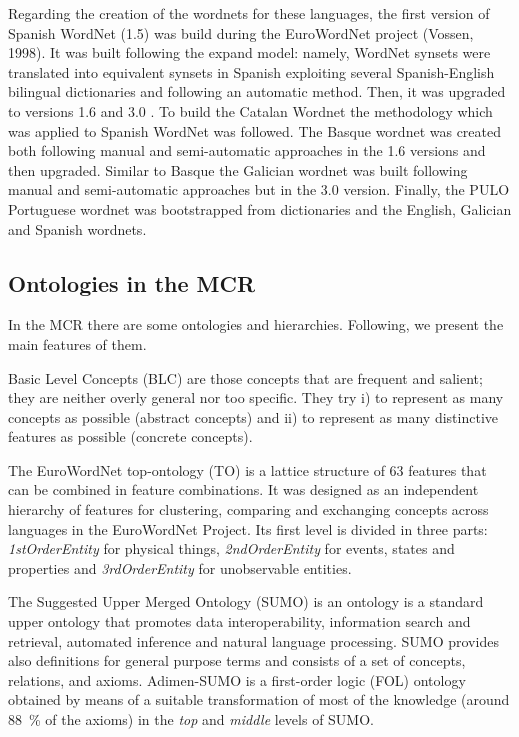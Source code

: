 \documentclass[runningheads]{llncs}
\begin{document}
Regarding the creation of the wordnets for these languages, the  first  version  of  Spanish  WordNet (1.5) \cite{atserias97,Farreres1998using} was build during the EuroWordNet project (Vossen, 1998). It was built following the  expand model: namely, WordNet synsets were translated into equivalent synsets in Spanish exploiting several Spanish-English bilingual dictionaries and following an automatic method. Then, it was upgraded to versions 1.6 \cite{atserias04}  and 3.0 \cite{gonzalez2012multilingual}.  To build the Catalan Wordnet \cite{benitez1998methods} the  methodology which was  applied  to  Spanish  WordNet was followed. The Basque wordnet was created both following manual and semi-automatic approaches \cite{pociello2011methodology} in the 1.6 versions and then upgraded.  Similar to Basque the Galician wordnet \cite{galnet}  was built following  manual and semi-automatic approaches but in the 3.0 version. Finally, the PULO Portuguese wordnet \cite{simoes2014bootstrapping} was bootstrapped from dictionaries and  the English, Galician and Spanish wordnets.





\subsection{Ontologies in the  MCR}

In the MCR there are some ontologies and hierarchies. Following, we present the main features of them.

Basic Level Concepts (BLC) are those concepts that are frequent and salient; they are neither overly general nor too specific. They try i)    to represent as many concepts as possible (abstract concepts) and ii)     to represent as many distinctive features as possible (concrete concepts).   

The EuroWordNet top-ontology (TO) is a lattice structure of 63 features that can be combined in feature combinations. It was designed as  an independent hierarchy of features  for clustering, comparing and exchanging concepts across languages in the EuroWordNet Project. Its first level is divided in three parts:  {\it 1stOrderEntity} for physical things, {\it 2ndOrderEntity} for events, states and properties and {\it  3rdOrderEntity} for unobservable entities. 

The Suggested Upper Merged Ontology (SUMO) is an ontology is a standard upper ontology that  promotes data interoperability,  information search and retrieval,  automated inference and natural language processing.  SUMO provides also  definitions for general purpose terms and consists of a set of concepts, relations, and axioms.  Adimen-SUMO \cite{ALR12} is a first-order logic (FOL) ontology obtained by means of a suitable transformation of most of the knowledge (around 88~\% of the axioms) in the {\it top} and {\it middle} levels of SUMO. 
\end{document}
